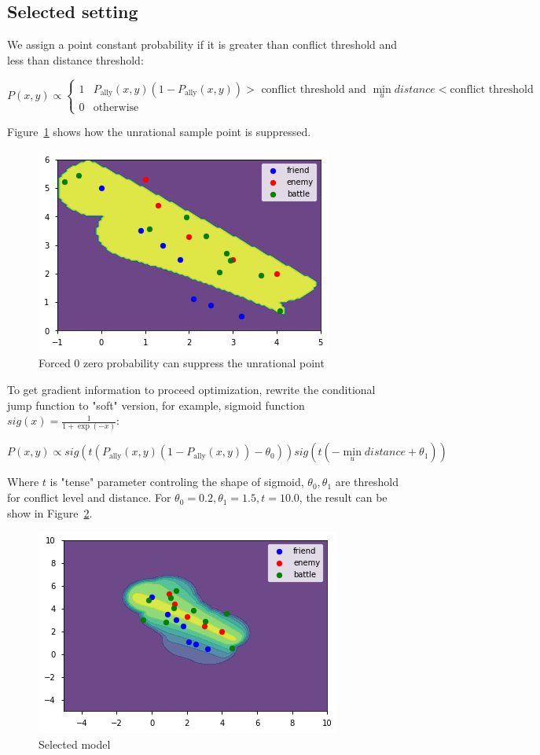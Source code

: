 \documentclass{article}
\begin{document}
\subsection{Selected setting}

We assign a point constant probability if it is greater than conflict threshold and less than distance 
threshold:

$$
P(x,y) \propto
\begin{cases}
1 & P_\text{ally}(x,y) (1-P_\text{ally}(x,y)) > \text{ conflict threshold and }
    \min_{u} distance < \text{conflict threshold} \\
0 & \text{otherwise}
\end{cases}
$$

Figure~\ref{fig:combFive} shows how the unrational sample point is suppressed.

\begin{figure}[h]
\includegraphics[width=0.6\linewidth]{comb5.png}
\caption{Forced 0 zero probability can suppress the unrational point}
\label{fig:combFive}
\end{figure}

To get gradient information to proceed optimization, rewrite the conditional jump function to "soft"
version, for example, sigmoid function $sig(x) = \frac{1}{1+\exp(-x)}$:

$$
P(x,y) \propto sig(t (P_\text{ally}(x,y) (1-P_\text{ally}(x,y)) - \theta_0)) sig(t(-\min_{u} distance + \theta_1))
$$

Where $t$ is "tense" parameter controling the shape of sigmoid, $\theta_0,\theta_1$ are threshold for
conflict level and distance. For $\theta_0=0.2,\theta_1=1.5,t = 10.0$, the result can be show in Figure~\ref{fig:combSix}.

\begin{figure}[h]
\includegraphics[width=0.6\linewidth]{comb6.png}
\caption{Selected model}
\label{fig:combSix}
\end{figure}
\end{document}
